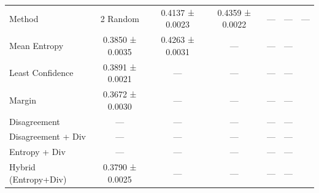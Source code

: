 \begin{tabular}{lccccc}
\toprule
Method & 2%
\midrule
Random & 0.4137 ± 0.0023 & 0.4359 ± 0.0022 & — & — & — \\
Mean Entropy & 0.3850 ± 0.0035 & 0.4263 ± 0.0031 & — & — & — \\
Least Confidence & 0.3891 ± 0.0021 & — & — & — & — \\
Margin & 0.3672 ± 0.0030 & — & — & — & — \\
Disagreement & — & — & — & — & — \\
Disagreement + Div & — & — & — & — & — \\
Entropy + Div & — & — & — & — & — \\
Hybrid (Entropy+Div) & 0.3790 ± 0.0025 & — & — & — & — \\
\bottomrule
\end{tabular}
